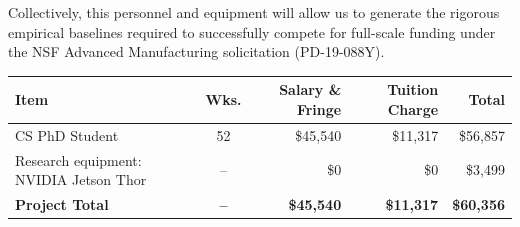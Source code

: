 \documentclass[11pt, letterpaper]{article}
\begin{document}
Collectively, this personnel and equipment will allow us to generate the rigorous empirical baselines required to successfully compete for full-scale funding under the NSF Advanced Manufacturing solicitation (PD-19-088Y).

\vspace{1em}
\begin{center}
\begin{tabular}{lcrrr}
\hline
\textbf{Item} & \textbf{Wks.} & \textbf{Salary \& Fringe} & \textbf{Tuition Charge} & \textbf{Total} \\
\hline
CS PhD Student & 52 & \$45,540 & \$11,317 & \$56,857 \\
Research equipment: NVIDIA Jetson Thor & -- & \$0 & \$0 & \$3,499 \\
\hline \hline
\textbf{Project Total} & \textbf{--} & \textbf{\$45,540} & \textbf{\$11,317} & \textbf{\$60,356} \\
\hline
\end{tabular}
\end{center}







\end{document}
